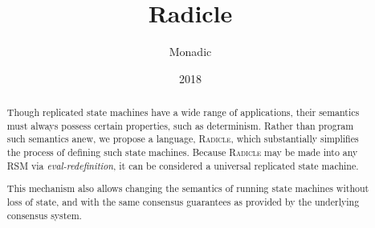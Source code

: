 \documentclass[a4paper, 9pt, draft]{amsart}
\title[Radicle]{Radicle}
\author{Monadic}
\date{2018}
\newcommand{\rad}{\textsc{Radicle}}
\begin{document}
\begin{abstract}
    Though replicated state machines have a wide range of applications, their
    semantics must always possess certain properties, such as determinism.
    Rather than program such semantics anew, we propose a language, \rad{},
    which substantially simplifies the process of defining such state machines.
    Because \rad{} may be made into any RSM via \emph{eval-redefinition}, it
    can be considered a universal replicated state machine.

    This mechanism also allows changing the semantics of running state machines
    without loss of state, and with the same consensus guarantees as provided
    by the underlying consensus system.
\end{abstract}
\maketitle
\tableofcontents

\setlength{\columnsep}{20pt}
\begin{multicols}{2}







\end{multicols}


\appendix
%



\end{document}
